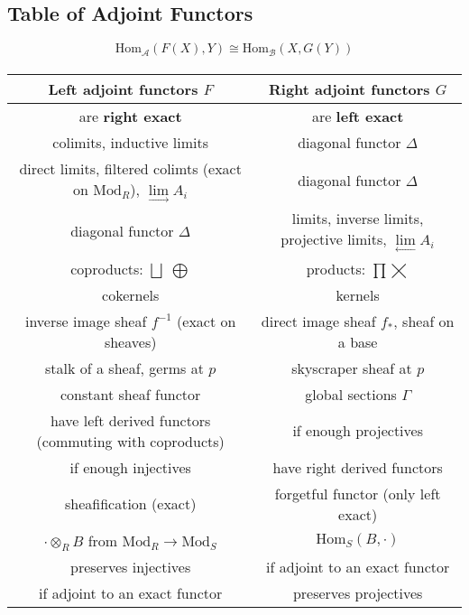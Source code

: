 \documentclass[12pt]{article}
\newcommand{\scr}[1]{\mathcal{#1}}
\newcommand{\Hom}{\mathrm{Hom}}
\newcommand{\Mod}{\mathrm{Mod}}
\begin{document}
\begin{center}
\section*{Table of Adjoint Functors}
\end{center}

\begin{equation*}
\Hom_{\scr{A}}(F(X), Y) \cong \Hom_{\scr{B}}(X, G(Y))
\end{equation*}
\paragraph{}

\begin{center}
\begin{tabular}{|c| c|}
\hline
\textbf{Left adjoint functors $F$} & \textbf{Right adjoint functors $G$} \\
\hline
are \textbf{right exact} & are \textbf{left exact} \\
colimits, inductive limits & diagonal functor $\Delta$ \\
direct limits, filtered colimts (exact on $\mathrm{Mod}_R$),  $\lim\limits_{\longrightarrow}A_i $ & diagonal functor $\Delta$ \\
diagonal functor $\Delta$ & limits, inverse limits, projective limits, $\lim\limits_{\longleftarrow} A_i$ \\
coproducts: $\bigsqcup$ $\bigoplus$ & products: $\prod \bigtimes$ \\ 
cokernels & kernels \\
inverse image sheaf $f^{-1}$ (exact on sheaves) & direct image sheaf $f_{*}$, sheaf on a base \\
stalk of a sheaf, germs at $p$ & skyscraper sheaf at $p$ \\
constant sheaf functor & global sections $\Gamma$ \\
have left derived functors (commuting with coproducts) &  if enough projectives \\
if enough injectives & have right derived functors \\
sheafification (exact) & forgetful functor (only left exact) \\
$\cdot \otimes_{R} B$ from $\Mod_{R} \to \Mod_{S}$ & $\Hom_{S}(B, \cdot)$ \\
preserves injectives & if adjoint to an exact functor \\
if adjoint to an exact functor & preserves projectives\\

\end{tabular}
\end{center}
\end{document}
